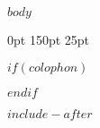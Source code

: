 \documentclass%
[crop=true,varwidth,border=0.50001bp,11pt]
{book} %
\begin{document}
\mainmatter

\primaryfont \normalsize \flushbottom $body$


\clearpage{\thispagestyle{empty}\cleardoublepage}

\backmatter

\pagestyle{empty}

\titlespacing*{\section}
{0pt}%
{150pt}%
{25pt}%

\titleformat{\section}[display]{\bfseries\titlefont}{}{0.5mm}{\centering \Large} %

\setlength{\parindent}{0mm}


$if(colophon)$


\clearpage{\thispagestyle{empty}\cleardoublepage}
$endif$




\clearpage

$include-after$

\end{document}
